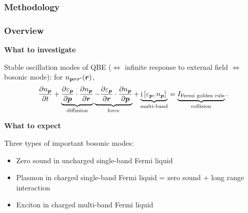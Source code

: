 \documentclass{beamer}
\DeclareMathOperator{\ii}{i}
\begin{document}
\begin{frame}
\frametitle{Methodology}



\end{frame}

\begin{frame}
    \frametitle{Overview}

    \textbf{What to investigate} 

    Stable oscillation modes of QBE ($\Leftrightarrow$ infinite response to external field
    $\Leftrightarrow$ bosonic mode): for $n_{\vb*{p} \sigma \sigma'}(\vb*{r})$,
    \begin{equation}
        \pdv{n_{\vb*{p} }}{t} 
        + \underbrace{\pdv{\varepsilon_{\vb*{p} }}{\vb*{p}} \cdot \pdv{n_{\vb*{p} }}{\vb*{r}}}_{\text{diffusion}}
        \underbrace{- \pdv{\varepsilon_{\vb*{p} }}{\vb*{r}} \cdot \pdv{n_{\vb*{p} }}{\vb*{p}}}_{\text{force}}
        + \underbrace{\ii \comm*{\varepsilon_{\vb*{p}}}{n_{\vb*{p}}}}_{\text{multi-band}}
        = \underbrace{I_{\text{Fermi golden rule}}}_{\text{collision}} .
    \end{equation}
    
    \vspace{0.5cm}

    \textbf{What to expect}

    Three types of important bosonic modes:
    
    \begin{itemize}
        \item Zero sound in uncharged single-band Fermi liquid
        \item Plasmon in charged single-band Fermi liquid = zero sound + long range interaction 
        \item Exciton in charged multi-band Fermi liquid
    \end{itemize}
    
\end{frame}
\end{document}
